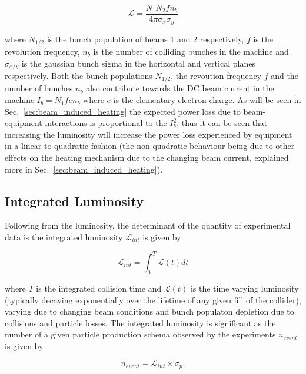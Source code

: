 \begin{equation}
\mathcal{L} = \frac{N_{1} N_{2} f n_{b}}{4 \pi \sigma_{x} \sigma_{y}}
\end{equation}

where $N_{1/2}$ is the bunch population of beams 1 and 2 respectively, $f$ is the revolution frequency, $n_{b}$ is the number of colliding bunches in the machine and $\sigma_{x/y}$ is the gaussian bunch sigma in the horizontal and vertical planes respectively. Both the bunch populations $N_{1/2}$, the revoution frequency $f$ and the number of bunches $n_{b}$ also contribute towards the DC beam current in the machine $I_{b} = N_{1} f e n_{b}$ where $e$ is the elementary electron charge. As will be seen in Sec.~\ref{sec:beam_induced_heating} the expected power loss due to beam-equipment interactions is proportional to the $I_{b}^{2}$, thus it can be seen that increasing the luminosity will increase the power loss experienced by equipment in a linear to quadratic fashion (the non-quadratic behaviour being due to other effects on the heating mechanism due to the changing beam current, explained more in Sec.~\ref{sec:beam_induced_heating}).

\subsection{Integrated Luminosity}

Following from the luminosity, the determinant of the quantity of experimental data is the integrated luminosity $\mathcal{L}_{int}$ is given by

\begin{equation}
\mathcal{L}_{int} = \int^{T}_{0} \mathcal{L} \left( t \right) dt
\end{equation}

where $T$ is the integrated collision time and $\mathcal{L} (t)$ is the time varying luminosity (typically decaying exponentially over the lifetime of any given fill of the collider\cite{McCrory:lumiEvo}), varying due to changing beam conditions and bunch populaton depletion due to collisions and particle losses. The integrated luminosity is significant as the number of a given particle production schema observed by the experiments $n_{event}$ is given by

\begin{equation}
n_{event} = \mathcal{L}_{int} \times \sigma_{p}.
\end{equation}

